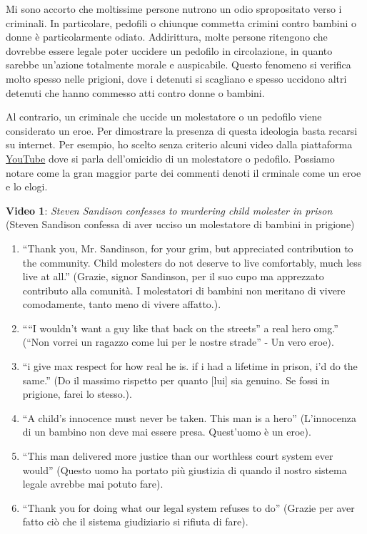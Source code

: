 \documentclass[a4paper, 12pt]{article}
\newcommand{\quotes}[1]{``#1''}
\begin{document}
Mi sono accorto che moltissime persone nutrono un odio spropositato
verso i criminali. In particolare, pedofili o chiunque commetta
crimini contro bambini o donne è particolarmente odiato.
Addirittura, molte persone ritengono che dovrebbe essere legale
poter uccidere un pedofilo in circolazione, in quanto sarebbe un'azione totalmente morale
e auspicabile.
Questo fenomeno si verifica molto spesso nelle prigioni, dove i detenuti
si scagliano e spesso uccidono altri detenuti che hanno commesso atti
contro donne o bambini.

Al contrario, un criminale che uccide un molestatore o un pedofilo
viene considerato un eroe. Per dimostrare la presenza di questa ideologia
basta recarsi su internet. Per esempio, ho scelto senza criterio
alcuni video dalla piattaforma \href{https://www.youtube.com/}{YouTube}
dove si parla dell'omicidio di un molestatore o pedofilo.
Possiamo notare come la gran maggior parte dei commenti denoti il crminale
come un eroe e lo elogi.

\textbf{Video 1}: \textit{Steven Sandison confesses to murdering child molester in prison}\cite{video1}
(Steven Sandison confessa di aver ucciso un molestatore di bambini in prigione)
\begin{enumerate}
    \item \enquote{Thank you, Mr. Sandinson, for your grim, but appreciated contribution to the community. Child molesters do not deserve to live comfortably, much less live at all.}
        (Grazie, signor Sandinson, per il suo cupo ma apprezzato contributo alla comunità. I molestatori di bambini non meritano di vivere comodamente, tanto meno di vivere affatto.).
    \item \enquote{“I wouldn’t want a guy like that back on the streets” a real hero omg.}
        (\quotes{Non vorrei un ragazzo come lui per le nostre strade} - Un vero eroe).
    \item \enquote{i give max respect for how real he is. if i had a lifetime in prison, i’d do the same.}
        (Do il massimo rispetto per quanto [lui] sia genuino. Se fossi in prigione, farei lo stesso.).
    \item \enquote{A child’s innocence must never be taken. This man is a hero}
        (L'innocenza di un bambino non deve mai essere presa. Quest'uomo è un eroe).
    \item \enquote{This man delivered more justice than our worthless court system ever would}
        (Questo uomo ha portato più giustizia di quando il nostro sistema legale avrebbe mai potuto fare).
    \item \enquote{Thank you for doing what our legal system refuses to do}
        (Grazie per aver fatto ciò che il sistema giudiziario si rifiuta di fare).
\end{enumerate}
\end{document}
